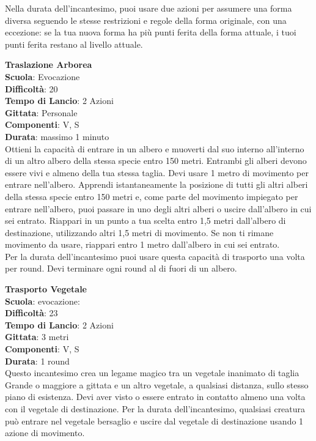 \begin{multicols}{2}
Nella durata dell'incantesimo, puoi usare due azioni per assumere una forma diversa seguendo le stesse restrizioni e regole della forma originale, con una eccezione: se la tua nuova forma ha più punti ferita  della forma attuale, i tuoi punti ferita restano al livello attuale.

\medskip\textbf{Traslazione Arborea}\\
\textbf{Scuola}: Evocazione\\
\textbf{Difficoltà}:  20\\
\textbf{Tempo di Lancio}: 2 Azioni\\
\textbf{Gittata}: Personale\\
\textbf{Componenti}: V, S\\
\textbf{Durata}: massimo 1 minuto\\
Ottieni la capacità di entrare in un albero e muoverti dal suo interno all'interno di un altro albero della stessa specie entro 150 metri. Entrambi gli alberi devono essere vivi e almeno della tua stessa taglia. Devi usare 1 metro di movimento per entrare nell'albero. Apprendi istantaneamente la posizione di tutti gli altri alberi della stessa specie entro 150 metri e, come parte del movimento impiegato per entrare nell'albero, puoi passare in uno degli altri alberi o uscire dall'albero in cui sei entrato. Riappari in un punto a tua scelta entro 1,5 metri dall'albero di destinazione, utilizzando altri 1,5 metri di movimento. Se non ti rimane movimento da usare, riappari entro 1 metro dall'albero in cui sei entrato.\\
Per la durata dell'incantesimo puoi usare questa capacità di trasporto una volta per round. Devi terminare ogni round al di fuori di un albero.

\medskip\textbf{Trasporto Vegetale}\\
\textbf{Scuola}: evocazione:\\\textbf{Difficoltà}:  23\\
\textbf{Tempo di Lancio}: 2 Azioni\\
\textbf{Gittata}: 3 metri\\
\textbf{Componenti}: V, S\\
\textbf{Durata}: 1 round\\
Questo incantesimo crea un legame magico tra un vegetale inanimato di taglia Grande o maggiore a gittata e un altro vegetale, a qualsiasi distanza, sullo stesso piano di esistenza. Devi aver visto o essere entrato in contatto almeno una volta con il vegetale di destinazione. Per la durata dell'incantesimo, qualsiasi creatura può entrare nel vegetale bersaglio e uscire dal vegetale di destinazione usando 1 azione di movimento.


\end{multicols}
